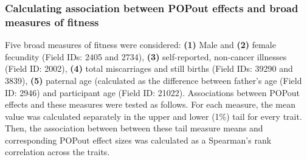 \documentclass[12pt]{zHenriquesLab-StyleBioRxiv}
\begin{document}
\subsubsection*{Calculating association between POPout effects and broad measures of fitness}
Five broad measures of fitness were considered: \textbf{(1)} Male and
\textbf{(2)} female fecundity (Field IDs: 2405 and 2734), \textbf{(3)}
self-reported, non-cancer illnesses (Field ID: 2002), \textbf{(4)}
total miscarriages and still births (Field IDs: 39290 and 3839),
\textbf{(5)} paternal age (calculated as the difference between
father's age (Field ID: 2946) and participant age (Field ID:
21022). Associations between POPout effects and these measures were
tested as follows. For each measure, the mean value was calculated
separately in the upper and lower (1\%) tail for every trait. Then,
the association between between these tail measure means and
corresponding POPout effect sizes was calculated as a Spearman's rank
correlation across the traits.


\clearpage \newpage 


\clearpage \newpage
\end{document}
